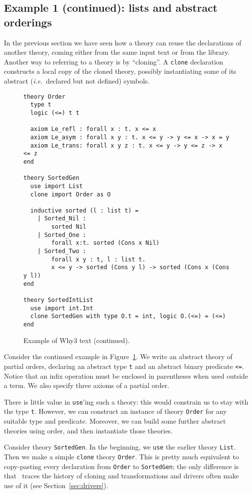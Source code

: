 \subsection{Example 1 (continued): lists and abstract orderings}

In the previous section we have seen how a theory can reuse the
declarations of another theory, coming either from the same input
text or from the library. Another way to referring to a theory is
by ``cloning''. A \texttt{clone} declaration constructs a local
copy of the cloned theory, possibly instantiating some of its
abstract (\emph{i.e.}~declared but not defined) symbols.

\begin{figure}
\centering
\begin{verbatim}
theory Order
  type t
  logic (<=) t t

  axiom Le_refl : forall x : t. x <= x
  axiom Le_asym : forall x y : t. x <= y -> y <= x -> x = y
  axiom Le_trans: forall x y z : t. x <= y -> y <= z -> x <= z
end

theory SortedGen
  use import List
  clone import Order as O

  inductive sorted (l : list t) =
    | Sorted_Nil :
        sorted Nil
    | Sorted_One :
        forall x:t. sorted (Cons x Nil)
    | Sorted_Two :
        forall x y : t, l : list t.
        x <= y -> sorted (Cons y l) -> sorted (Cons x (Cons y l))
end

theory SortedIntList
  use import int.Int
  clone SortedGen with type O.t = int, logic O.(<=) = (<=)
end
\end{verbatim}
\caption{Example of Why3 text (continued).}
\label{fig:tutorial2}
\end{figure}

Consider the continued example in Figure~\ref{fig:tutorial2}.
We write an abstract theory of partial orders, declaring an
abstract type \texttt{t} and an abstract binary predicate
\texttt{<=}. Notice that an infix operation must be enclosed
in parentheses when used outside a term. We also specify
three axioms of a partial order.

There is little value in \texttt{use}'ing such a theory: this
would constrain us to stay with the type \texttt{t}. However,
we can construct an instance of theory \texttt{Order} for
any suitable type and predicate. Moreover, we can build some
further abstract theories using order, and then instantiate
those theories.

Consider theory \texttt{SortedGen}. In the beginning, we
\texttt{use} the earlier theory \texttt{List}. Then we
make a simple \texttt{clone} theory \texttt{Order}.
This is pretty much equivalent to copy-pasting every
declaration from \texttt{Order} to \texttt{SortedGen};
the only difference is that \why\ traces the history
of cloning and transformations and drivers often make
use of it (see Section~\ref{sec:drivers}).

